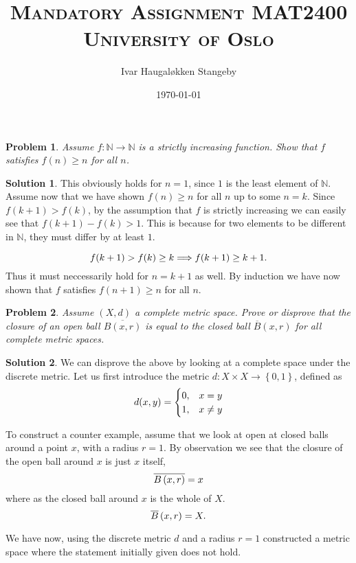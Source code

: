 \documentclass[a4paper]{article}
\title{
  \huge{\textsc{Mandatory Assignment  MAT2400}} \\
  \textsc{University of Oslo}
}
\author{Ivar Haugaløkken Stangeby}
\date{\today}
\newtheorem{prb}{Problem}
\theoremstyle{definition}
\newtheorem{sol}{Solution}
\begin{document}
\maketitle
\begin{prb}
  Assume $f : \mathbb{N} \rightarrow \mathbb{N}$ is a strictly increasing function.
  Show that $f$ satisfies $f(n) \geq n$ for all $n$.
\end{prb}

\begin{sol}
This obviously holds for $n = 1$, since $1$ is the least element of
$\mathbb{N}$.  Assume now that we have shown $f(n) \geq n$ for all $n$ up to
some $n = k$.  Since $f(k+1) > f(k)$, by the assumption that $f$ is strictly
increasing we can easily see that $f(k+1) - f(k) > 1$. This is because for two
elements to be different in $\mathbb{N}$, they must differ by at least $1$.

\begin{equation}
  \notag
  f(k+1) > f(k) \geq k \Longrightarrow f(k+1) \geq k + 1.
\end{equation}
Thus it must neccessarily hold for $n = k+1$ as well.
By induction we have now shown that $f$ satisfies $f(n+1) \geq n$ for all $n$.
\end{sol}

\begin{prb}
  Assume $\left( X, d \right)$ a complete metric space. Prove or disprove that the closure of
  an open ball $\overline{ B\left( x, r \right)}$ is equal to the closed ball
  $\overline{ B }\left( x, r \right)$ for all complete metric spaces.
\end{prb}

\begin{sol}
  We can disprove the above by looking at a complete space under the discrete metric.
  Let us first introduce the metric $d : X \times X \rightarrow \left\{ 0, 1 \right\}$, defined
  as
  \begin{equation}
    \notag
    d(x, y) = \begin{cases}
                0, & x = y \\
                1, & x \neq y
              \end{cases}
  \end{equation}

  To construct a counter example, assume that we look at open at closed balls
  around a point $x$, with a radius $r = 1$. By observation we see that the
  closure of the open ball around $x$ is just $x$ itself, 
  \begin{equation}
    \notag
    \overline{ B\left( x, r \right)} = x
  \end{equation}
  where as the closed ball around $x$ is the whole of $X$. 
  \begin{equation}
    \notag
    \overline{B}\left( x, r \right) = X.
  \end{equation}

  We have now, using the discrete metric $d$ and a radius $r = 1$ constructed a
  metric space where the statement initially given does not hold.
\end{sol}
\end{document}
